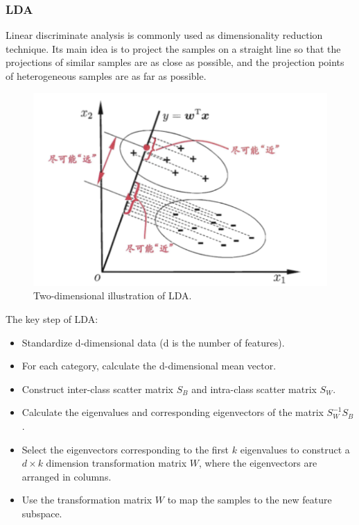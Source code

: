 \documentclass{article}
\begin{document}
\subsubsection{LDA}
\indent Linear discriminate analysis is commonly used as dimensionality reduction technique. Its main idea is to project the samples on a straight line so that the projections of similar samples are as close as possible, and the projection points of heterogeneous samples are as far as possible. 
	\begin{figure}[htbp]
		\centering
		\includegraphics[scale=0.3]{figures/LDA.png}
		\caption{Two-dimensional illustration of LDA.}
		\label{fig:LDA}
	\end{figure}\cite{zhihuazhou2016ml}\par
\indent The key step of LDA:
\begin{itemize}
		\item Standardize d-dimensional data (d is the number of features).
		
		\item For each category, calculate the d-dimensional mean vector.
		
		\item Construct inter-class scatter matrix $S_B$ and intra-class scatter matrix $S_W$.
		
		\item Calculate the eigenvalues and corresponding eigenvectors of the matrix $S^{-1}_WS_B$.
		
		\item Select the eigenvectors corresponding to the first $k$ eigenvalues to construct a $d × k$ dimension transformation matrix $W$, where the eigenvectors are arranged in columns.
		
		\item Use the transformation matrix $W$ to map the samples to the new feature subspace.
		
\end{itemize}
\end{document}
